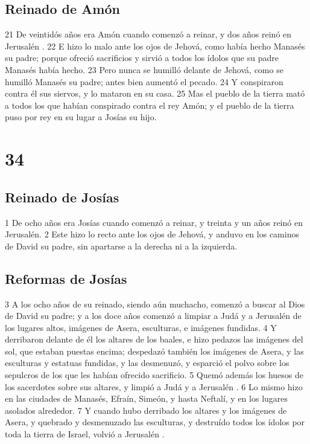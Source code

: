 \section*{Reinado de Amón }

21 De veintidós años era Amón cuando comenzó a reinar, y dos años reinó en Jerusalén .
22 E hizo lo malo ante los ojos de Jehová, como había hecho Manasés su padre; porque ofreció sacrificios y sirvió a todos los ídolos que su padre Manasés había hecho.
23 Pero nunca se humilló delante de Jehová, como se humilló Manasés su padre; antes bien aumentó el pecado.
24 Y conspiraron contra él sus siervos, y lo mataron en su casa.
25 Mas el pueblo de la tierra mató a todos los que habían conspirado contra el rey Amón; y el pueblo de la tierra puso por rey en su lugar a Josías su hijo.

\chapter{34}

\section*{Reinado de Josías}

1 De ocho años era Josías cuando comenzó a reinar, y treinta y un años reinó en Jerusalén. 
2 Este hizo lo recto ante los ojos de Jehová, y anduvo en los caminos de David su padre, sin apartarse a la derecha ni a la izquierda.

\section*{Reformas de Josías}

3 A los ocho años de su reinado, siendo aún muchacho, comenzó a buscar al Dios de David su padre; y a los doce años comenzó a limpiar a Judá y a Jerusalén  de los lugares altos, imágenes de Asera, esculturas, e imágenes fundidas.
4 Y derribaron delante de él los altares de los baales, e hizo pedazos las imágenes del sol, que estaban puestas encima; despedazó también los imágenes de Asera, y las esculturas y estatuas fundidas, y las desmenuzó, y esparció el polvo sobre los sepulcros de los que les habían ofrecido sacrificio.
5 Quemó además los huesos de los sacerdotes sobre sus altares, y limpió a Judá y a Jerusalén .
6 Lo mismo hizo en las ciudades de Manasés, Efraín, Simeón, y hasta Neftalí, y en los lugares asolados alrededor.
7 Y cuando hubo derribado los altares y los imágenes de Asera, y quebrado y desmenuzado las esculturas, y destruído todos los ídolos por toda la tierra de Israel, volvió a Jerusalén .

